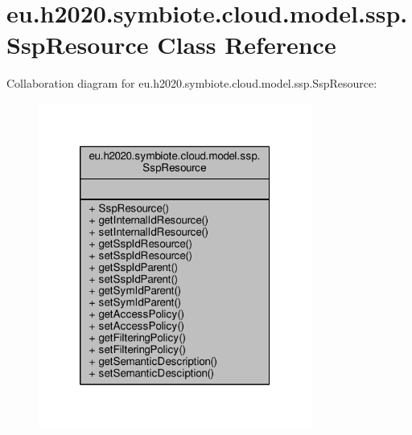 \hypertarget{classeu_1_1h2020_1_1symbiote_1_1cloud_1_1model_1_1ssp_1_1SspResource}{}\section{eu.\+h2020.\+symbiote.\+cloud.\+model.\+ssp.\+Ssp\+Resource Class Reference}
\label{classeu_1_1h2020_1_1symbiote_1_1cloud_1_1model_1_1ssp_1_1SspResource}


Collaboration diagram for eu.\+h2020.\+symbiote.\+cloud.\+model.\+ssp.\+Ssp\+Resource\+:
\nopagebreak
\begin{figure}[H]
\begin{center}
\leavevmode
\includegraphics[width=254pt]{classeu_1_1h2020_1_1symbiote_1_1cloud_1_1model_1_1ssp_1_1SspResource__coll__graph}
\end{center}
\end{figure}
